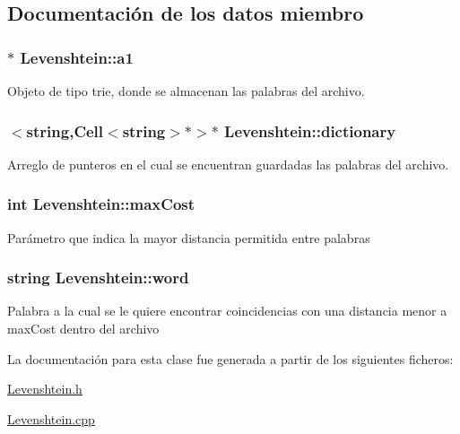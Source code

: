 \subsection{Documentación de los datos miembro}
\hypertarget{class_levenshtein_acf70b2763312e65fb453b4c5b2adfa5d}{
\subsubsection[{a1}]{$\ast$ Levenshtein\-::a1}}\label{class_levenshtein_acf70b2763312e65fb453b4c5b2adfa5d}
Objeto de tipo trie, donde se almacenan las palabras del archivo. \hypertarget{class_levenshtein_a0813931782653e92b834c70354316260}{
\subsubsection[{dictionary}]{$<$string,{\bf Cell}$<$string$>$$\ast$$>$$\ast$ Levenshtein\-::dictionary}}\label{class_levenshtein_a0813931782653e92b834c70354316260}
Arreglo de punteros en el cual se encuentran guardadas las palabras del archivo. \hypertarget{class_levenshtein_aefd28eb150c7d3baf3448551d18f9c9d}{
\subsubsection[{max\-Cost}]{\setlength{\rightskip}{0pt plus 5cm}int Levenshtein\-::max\-Cost}}\label{class_levenshtein_aefd28eb150c7d3baf3448551d18f9c9d}
Parámetro que indica la mayor distancia permitida entre palabras \hypertarget{class_levenshtein_ae0f3d52b4b02545b63e94509e0df0a85}{
\subsubsection[{word}]{\setlength{\rightskip}{0pt plus 5cm}string Levenshtein\-::word}}\label{class_levenshtein_ae0f3d52b4b02545b63e94509e0df0a85}
Palabra a la cual se le quiere encontrar coincidencias con una distancia menor a max\-Cost dentro del archivo 

La documentación para esta clase fue generada a partir de los siguientes ficheros\-:\begin{DoxyCompactItemize}
\item 
\hyperlink{_levenshtein_8h}{Levenshtein.\-h}\item 
\hyperlink{_levenshtein_8cpp}{Levenshtein.\-cpp}\end{DoxyCompactItemize}
